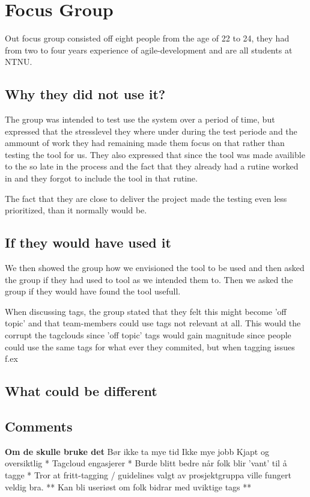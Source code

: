 \section{Focus Group}
Out focus group consisted off eight people from the age of 22 to 24, they had from two to four years experience of agile-development and are all students at NTNU.

\subsection{Why they did not use it?}
The group was intended to test use the system over a period of time, but expressed that the stresslevel they where under during the test periode and the ammount of work they had remaining made them focus on that rather than testing the tool for us. They also expressed that since the tool was made availible to the so late in the process and the fact that they already had a rutine worked in and they forgot to include the tool in that rutine.

The fact that they are close to deliver the project made the testing even less prioritized, than it normally would be.

\subsection{If they would have used it}
We then showed the group how we envisioned the tool to be used and then asked the group if they had used to tool as we intended them to. Then we asked the group if they would have found the tool usefull.

When discussing tags, the group stated that they felt this might become 'off topic' and that team-members could use tags not relevant at all. This would the corrupt the tagclouds since 'off topic' tags would gain magnitude since people could use the same tags for what ever they commited, but when tagging issues f.ex

\subsection{What could be different}

\subsection{Comments}

\textbf{Om de skulle bruke det}
Bør ikke ta mye tid
Ikke mye jobb
Kjapt og oversiktlig
 * Tagcloud engasjerer
 * Burde blitt bedre når folk blir 'vant' til å tagge
 * Tror at fritt-tagging / guidelines valgt av prosjektgruppa ville fungert veldig bra.
 ** Kan bli useriøst om folk bidrar med uviktige tags ** 

